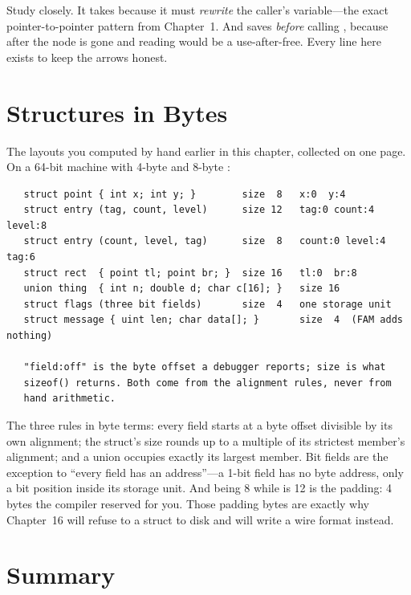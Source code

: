 Study  closely. It takes  because it must \emph{rewrite} the caller's 
variable---the exact pointer-to-pointer pattern from Chapter~1.
And  saves  \emph{before} calling
, because after  the node is gone and
reading  would be a use-after-free. Every line here
exists to keep the arrows honest.

\section{Structures in Bytes}

The layouts you computed by hand earlier in this chapter, collected on
one page. On a 64-bit machine with 4-byte  and 8-byte
:

\begin{verbatim}
   struct point { int x; int y; }        size  8   x:0  y:4
   struct entry (tag, count, level)      size 12   tag:0 count:4 level:8
   struct entry (count, level, tag)      size  8   count:0 level:4 tag:6
   struct rect  { point tl; point br; }  size 16   tl:0  br:8
   union thing  { int n; double d; char c[16]; }   size 16
   struct flags (three bit fields)       size  4   one storage unit
   struct message { uint len; char data[]; }       size  4  (FAM adds nothing)

   "field:off" is the byte offset a debugger reports; size is what
   sizeof() returns. Both come from the alignment rules, never from
   hand arithmetic.
\end{verbatim}

The three rules in byte terms: every field starts at a byte offset
divisible by its own alignment; the struct's size rounds up to a
multiple of its strictest member's alignment; and a union occupies
exactly its largest member. Bit fields are the exception to ``every
field has an address''---a 1-bit field has no byte address, only a bit
position inside its storage unit. And  being 8 while  is 12 is the
padding: 4 bytes the compiler reserved for you. Those padding bytes
are exactly why Chapter~16 will refuse to  a struct to
disk and will write a wire format instead.

\section{Summary}

